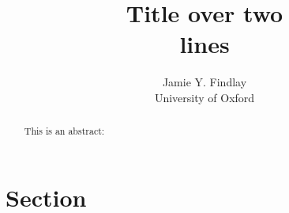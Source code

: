 \documentclass[
11pt,
draft,
a4paper
]{article}
\title{Title over two \\ lines}
\author{Jamie Y. Findlay\\\small University of Oxford\\\small\email{jamie.findlay@ling-phil.ox.ac.uk}}
\date{}
\begin{document}
\maketitle

\begin{abstract}%
This is an abstract: \lipsum[1]
\end{abstract}

\section{Section}

\lipsum



\end{document}
